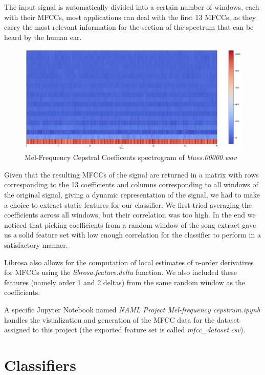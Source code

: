 \documentclass[12pt]{article}
\begin{document}
	The input signal is automatically divided into a certain number of windows, each with their MFCCs, most applications can deal with the first 13 MFCCs, as they carry the most relevant information for the section of the spectrum that can be heard by the human ear.
	\begin{figure}[H]
		\includegraphics[scale=0.4]{mfcc_spectrogram}
		\caption{Mel-Frequency Cepstral Coefficents spectrogram of \textit{blues.00000.wav}}
	\end{figure}
	
	Given that the resulting MFCCs of the signal are returned in a matrix with rows corresponding to the 13 coefficients and columns corresponding to all windows of the original signal, giving a dynamic representation of the signal, we had to make a choice to extract static features for our classifier. We first tried averaging the coefficients across all windows, but their correlation was too high. In the end we noticed that picking coefficients from a random window of the song extract gave us a solid feature set with low enough correlation for the classifier to perform in a satisfactory manner.
	
	Librosa also allows for the computation of local estimates of n-order derivatives for MFCCs using the \textit{librosa.feature.delta} function. We also included these features (namely order 1 and 2 deltas) from the same random window as the coefficients. 
	
	A specific Jupyter Notebook named \textit{NAML Project Mel-frequency cepstrum.ipynb} handles the visualization and generation of the MFCC data for the dataset assigned to this project (the exported feature set is called \textit{mfcc\_dataset.csv}).
	
	\newpage
	
	\section{Classifiers}
\end{document}
